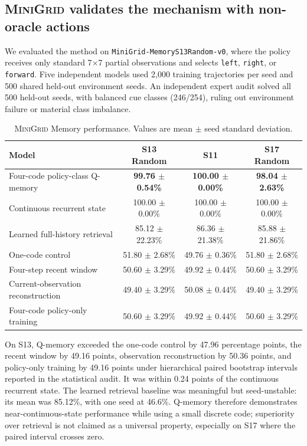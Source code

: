 \documentclass[11pt]{article}
\newcommand{\minigrid}{\textsc{MiniGrid}}
\begin{document}
\subsection{\minigrid{} validates the mechanism with non-oracle actions}
We evaluated the method on \texttt{MiniGrid-MemoryS13Random-v0}, where the policy receives only standard 7$\times$7 partial observations and selects \texttt{left}, \texttt{right}, or \texttt{forward}. Five independent models used 2,000 training trajectories per seed and 500 shared held-out environment seeds. An independent expert audit solved all 500 held-out seeds, with balanced cue classes (246/254), ruling out environment failure or material class imbalance.

\begin{table}[t]
\centering
\caption{\minigrid{} Memory performance. Values are mean $\pm$ seed standard deviation.}
\label{tab:minigrid}
\begin{tabular}{@{}lccc@{}}
\toprule
Model & S13 Random & S11 & S17 Random\\
\midrule
Four-code policy-class Q-memory & \textbf{99.76 $\pm$ 0.54\%} & \textbf{100.00 $\pm$ 0.00\%} & \textbf{98.04 $\pm$ 2.63\%}\\
Continuous recurrent state & 100.00 $\pm$ 0.00\% & 100.00 $\pm$ 0.00\% & 100.00 $\pm$ 0.00\%\\
Learned full-history retrieval & 85.12 $\pm$ 22.23\% & 86.36 $\pm$ 21.38\% & 85.88 $\pm$ 21.86\%\\
One-code control & 51.80 $\pm$ 2.68\% & 49.76 $\pm$ 0.36\% & 51.80 $\pm$ 2.68\%\\
Four-step recent window & 50.60 $\pm$ 3.29\% & 49.92 $\pm$ 0.44\% & 50.60 $\pm$ 3.29\%\\
Current-observation reconstruction & 49.40 $\pm$ 3.29\% & 50.08 $\pm$ 0.44\% & 49.40 $\pm$ 3.29\%\\
Four-code policy-only training & 50.60 $\pm$ 3.29\% & 49.92 $\pm$ 0.44\% & 50.60 $\pm$ 3.29\%\\
\bottomrule
\end{tabular}
\end{table}

On S13, Q-memory exceeded the one-code control by 47.96 percentage points, the recent window by 49.16 points, observation reconstruction by 50.36 points, and policy-only training by 49.16 points under hierarchical paired bootstrap intervals reported in the statistical audit. It was within 0.24 points of the continuous recurrent state. The learned retrieval baseline was meaningful but seed-unstable: its mean was 85.12\%, with one seed at 46.6\%. Q-memory therefore demonstrates near-continuous-state performance while using a small discrete code; superiority over retrieval is not claimed as a universal property, especially on S17 where the paired interval crosses zero.
\end{document}
